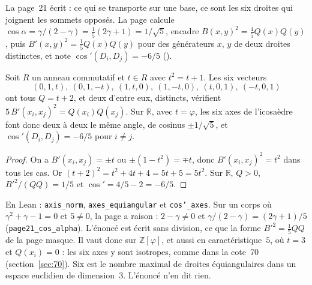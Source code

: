 La page~21 écrit  : ce qui se transporte sur une base, ce sont les six droites qui joignent les sommets opposés. La page calcule $\cos\alpha = \gamma/(2 - \gamma) = \frac15(2\gamma + 1) = 1/\sqrt5$, encadre $B(x, y)^2 = \frac45 Q(x)Q(y)$, puis $B'(x, y)^2 = \frac15 Q(x)Q(y)$ pour des générateurs $x$, $y$ de deux droites distinctes, et note $\cos'(D_i, D_j) = -6/5$ ().

\begin{encadre}
\begin{enonce}[Page 21, sur tout anneau où $t^2 = t + 1$]
Soit $R$ un anneau commutatif et $t \in R$ avec $t^2 = t + 1$. Les six vecteurs
\[
(0, 1, t),\ (0, 1, -t),\ (1, t, 0),\ (1, -t, 0),\ (t, 0, 1),\ (-t, 0, 1)
\]
ont tous $Q = t + 2$, et deux d'entre eux, distincts, vérifient $5\,B'(x_i, x_j)^2 = Q(x_i)Q(x_j)$. Sur $\mathbb R$, avec $t = \varphi$, les six axes de l'icosaèdre font donc deux à deux le même angle, de cosinus $\pm 1/\sqrt5$, et $\cos'(D_i, D_j) = -6/5$ pour $i \neq j$.
\end{enonce}
\end{encadre}

\begin{proof}
On a $B'(x_i, x_j) = \pm t$ ou $\pm(1 - t^2) = \mp t$, donc $B'(x_i, x_j)^2 = t^2$ dans tous les cas. Or $(t + 2)^2 = t^2 + 4t + 4 = 5t + 5 = 5t^2$. Sur $\mathbb R$, $Q > 0$, $B'^2/(QQ) = 1/5$ et $\cos' = 4/5 - 2 = -6/5$.
\end{proof}

\noindent En Lean : \texttt{axis\_norm}, \texttt{axes\_equiangular} et \texttt{cos'\_axes}. Sur un corps où $\gamma^2 + \gamma - 1 = 0$ et $5 \neq 0$, la page a raison : $2 - \gamma \neq 0$ et $\gamma/(2 - \gamma) = (2\gamma + 1)/5$ (\texttt{page21\_cos\_alpha}). L'énoncé est écrit sans division, ce que la forme $B'^2 = \frac15 QQ$ de la page masque. Il vaut donc sur $\mathbb Z[\varphi]$, et aussi en caractéristique~$5$, où $t = 3$ et $Q(x_i) = 0$ : les six axes y sont isotropes, comme dans la cote~70 (section~\ref{sec:70}). Six est le nombre maximal de droites équiangulaires dans un espace euclidien de dimension~$3$. L'énoncé n'en dit rien.

